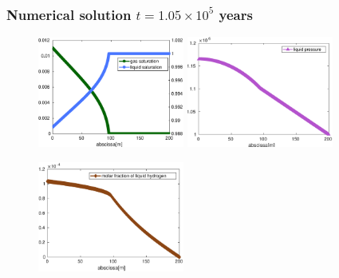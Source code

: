 \documentclass[10 pt]{beamer}
\begin{document}
\begin{frame}
\frametitle{Numerical solution $t = 1.05 \times 10^{5}$ years}
\vspace{-0.2 cm}\begin{figure}
\centering
\includegraphics[width=0.43\textwidth]{image/saturations_cv_solver_1000_cells_nt=20} \quad
\includegraphics[width=0.43\textwidth]{image/liquid_pressure_cv_solver_1000_cells_nt=20}
\end{figure}
\vspace{-0.3 cm}
\begin{figure}
\includegraphics[width=0.43\textwidth]{image/mole_frac_cv_solver_1000_cells_nt=20}
\end{figure}
\end{frame}
\end{document}
